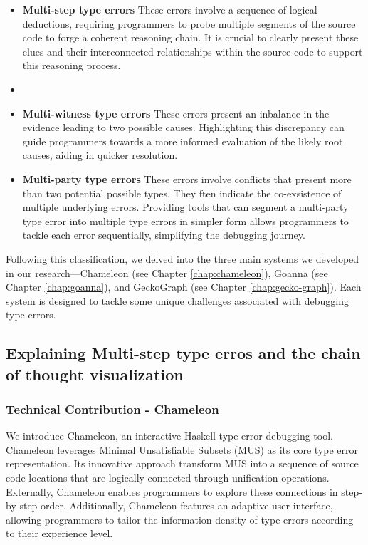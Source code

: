 \begin{itemize}
    \item {\textbf{Multi-step type errors} These errors involve a sequence of logical deductions, requiring programmers to probe multiple segments of the source code to forge a coherent reasoning chain. It is crucial to clearly present these clues and their interconnected relationships within the source code to support this reasoning process.}
    \item 
    \item{\textbf{Multi-witness type errors}  These errors present an inbalance in the evidence leading to two possible causes. Highlighting this discrepancy can guide programmers towards a more informed evaluation of the likely root causes, aiding in quicker resolution.}
    \item{\textbf{Multi-party type errors} These errors involve conflicts that present more than two potential possible types. They ften indicate the co-exsistence  of multiple underlying errors. Providing tools that can segment a multi-party type error into multiple type errors in simpler form allows programmers to tackle each error sequentially, simplifying the debugging journey.}
\end{itemize}


Following this classification, we delved into the three main systems we developed in our research—Chameleon (see Chapter \ref{chap:chameleon}), Goanna (see Chapter \ref{chap:goanna}), and GeckoGraph (see Chapter \ref{chap:gecko-graph}). Each system is designed to tackle some unique challenges associated with debugging type errors.

\subsection{Explaining Multi-step type erros and the chain of thought visualization}

\subsubsection{Technical Contribution - Chameleon}
We introduce Chameleon, an interactive Haskell type error debugging tool. Chameleon leverages Minimal Unsatisfiable Subsets (MUS) as its core type error representation. Its innovative approach transform MUS into a sequence of source code locations that are logically connected through unification operations. Externally, Chameleon enables programmers to explore these connections in step-by-step order. Additionally, Chameleon features an adaptive user interface, allowing programmers to tailor the information density of type errors according to their experience level.


